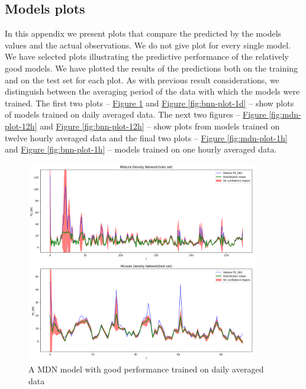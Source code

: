\documentclass[12pt,a4paper,twoside]{scrartcl}
\numberwithin{equation}{section}
\newcommand{\reffig}[1]{\hyperref[#1]{Figure \ref*{#1}}}
\newcounter{mypagecount}%
\newenvironment{interlude}{%
  \clearpage
  \setcounter{mypagecount}{\value{page}}%
  \thispagestyle{empty}%
  \pagestyle{empty}%
}{%
  \clearpage
  \setcounter{page}{\value{mypagecount}}%
}
\let\chapter=\section %
\begin{document}
\begin{interlude}
\begin{appendices}
    \chapter{Models plots}\label{app:f}
    In this appendix we present plots that compare the predicted by the models values and the actual observations. We do not give plot for every single model. We have selected plots illustrating the predictive performance of the relatively good models. We have plotted the results of the predictions both on the training and on the test set for each plot. As with previous result considerations, we distinguish between the averaging period of the data with which the models were trained. The first two plots -- \reffig{fig:mdn-plot-1d} and \reffig{fig:bnn-plot-1d} -- show plots of models trained on daily averaged data. The next two figures -- \reffig{fig:mdn-plot-12h} and \reffig{fig:bnn-plot-12h} -- show plots from models trained on twelve hourly averaged data and the final two plots -- \reffig{fig:mdn-plot-1h} and \reffig{fig:bnn-plot-1h} -- models trained on one hourly averaged data.
    \begin{center}
      \begin{figure}[h!]
        \centering
        \includegraphics[height=0.75\textwidth, width=0.9\textwidth]{figures/model_plots/mdn_1d}
        \caption[MDN one day plot]{A MDN model with good performance trained on daily averaged data}\label{fig:mdn-plot-1d}
      \end{figure}
    \end{center}
    \begin{center}
      \begin{figure}[h!]

\end{figure}
\end{center}
\end{appendices}
\end{interlude}
\end{document}
